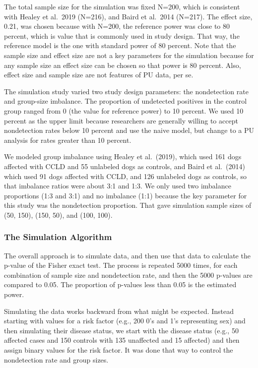 \documentclass[
]{article}
\begin{document}
The total sample size for the simulation was fixed N=200, which is
consistent with Healey et al.~2019 (N=216), and Baird et al.~2014
(N=217). \cite{bcioa14} \cite{hmhcbhkr19} The effect size, 0.21, was
chosen because with N=200, the reference power was close to 80 percent,
which is value that is commonly used in study design. That way, the
reference model is the one with standard power of 80 percent. Note that
the sample size and effect size are not a key parameters for the
simulation because for any sample size an effect size can be chosen so
that power is 80 percent. Also, effect size and sample size are not
features of PU data, per se.

The simulation study varied two study design parameters: the
nondetection rate and group-size imbalance. The proportion of undetected
positives in the control group ranged from 0 (the value for reference
power) to 10 percent. We used 10 percent as the upper limit because
researchers are generally willing to accept nondetection rates below 10
percent and use the naive model, but change to a PU analysis for rates
greater than 10 percent. \cite{bd20}

We modeled group imbalance using Healey et al.~(2019), which used 161
dogs affected with CCLD and 55 unlabeled dogs as controls, and Baird et
al.~(2014) which used 91 dogs affected with CCLD, and 126 unlabeled dogs
as controls, so that imbalance ratios were about 3:1 and 1:3.
\cite{bcioa14} \cite{hmhcbhkr19} We only used two imbalance proportions
(1:3 and 3:1) and no imbalance (1:1) because the key parameter for this
study was the nondetection proportion. That gave simulation sample sizes
of (50, 150), (150, 50), and (100, 100).

\pagebreak

\hypertarget{the-simulation-algorithm}{%
\subsubsection{The Simulation
Algorithm}\label{the-simulation-algorithm}}

The overall approach is to simulate data, and then use that data to
calculate the p-value of the Fisher exact test. The process is repeated
5000 times, for each combination of sample size and nondetection rate,
and then the 5000 p-values are compared to 0.05. The proportion of
p-values less than 0.05 is the estimated power.

Simulating the data works backward from what might be expected. Instead
starting with values for a risk factor (e.g., 200 0's and 1's
representing sex) and then simulating their disease status, we start
with the disease status (e.g., 50 affected cases and 150 controls with
135 unaffected and 15 affected) and then assign binary values for the
risk factor. It was done that way to control the nondetection rate and
group sizes.
\end{document}
